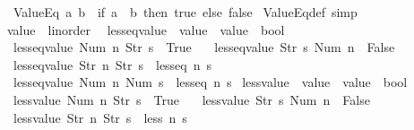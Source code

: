 \begin{isabellebody}
\ \ {\isachardoublequoteopen}ValueEq\ a\ b\ {\isasymequiv}\ {\isacharparenleft}if\ a\ {\isacharequal}\ b\ then\ true\ else\ false{\isacharparenright}{\isachardoublequoteclose}\isanewline
{}\isamarkupfalse%
\ ValueEq{\isacharunderscore}def\ {\isacharbrackleft}simp{\isacharbrackright}\isanewline
\isanewline
{}\isamarkupfalse%
\ {\isachardoublequoteopen}value{\isachardoublequoteclose}\ {\isacharcolon}{\isacharcolon}\ linorder\ \isanewline
{}\isamarkupfalse%
\ less{\isacharunderscore}eq{\isacharunderscore}value\ {\isacharcolon}{\isacharcolon}\ {\isachardoublequoteopen}value\ {\isasymRightarrow}\ value\ {\isasymRightarrow}\ bool{\isachardoublequoteclose}\ \isanewline
\ \ {\isachardoublequoteopen}less{\isacharunderscore}eq{\isacharunderscore}value\ {\isacharparenleft}Num\ n{\isacharparenright}\ {\isacharparenleft}Str\ s{\isacharparenright}\ {\isacharequal}\ True{\isachardoublequoteclose}\ {\isacharbar}\isanewline
\ \ {\isachardoublequoteopen}less{\isacharunderscore}eq{\isacharunderscore}value\ {\isacharparenleft}Str\ s{\isacharparenright}\ {\isacharparenleft}Num\ n{\isacharparenright}\ {\isacharequal}\ False{\isachardoublequoteclose}\ {\isacharbar}\isanewline
\ \ {\isachardoublequoteopen}less{\isacharunderscore}eq{\isacharunderscore}value\ {\isacharparenleft}Str\ n{\isacharparenright}\ {\isacharparenleft}Str\ s{\isacharparenright}\ {\isacharequal}\ less{\isacharunderscore}eq\ n\ s{\isachardoublequoteclose}\ {\isacharbar}\isanewline
\ \ {\isachardoublequoteopen}less{\isacharunderscore}eq{\isacharunderscore}value\ {\isacharparenleft}Num\ n{\isacharparenright}\ {\isacharparenleft}Num\ s{\isacharparenright}\ {\isacharequal}\ less{\isacharunderscore}eq\ n\ s{\isachardoublequoteclose}\isanewline
\isanewline
{}\isamarkupfalse%
\ less{\isacharunderscore}value\ {\isacharcolon}{\isacharcolon}\ {\isachardoublequoteopen}value\ {\isasymRightarrow}\ value\ {\isasymRightarrow}\ bool{\isachardoublequoteclose}\ \isanewline
\ \ {\isachardoublequoteopen}less{\isacharunderscore}value\ {\isacharparenleft}Num\ n{\isacharparenright}\ {\isacharparenleft}Str\ s{\isacharparenright}\ {\isacharequal}\ True{\isachardoublequoteclose}\ {\isacharbar}\isanewline
\ \ {\isachardoublequoteopen}less{\isacharunderscore}value\ {\isacharparenleft}Str\ s{\isacharparenright}\ {\isacharparenleft}Num\ n{\isacharparenright}\ {\isacharequal}\ False{\isachardoublequoteclose}\ {\isacharbar}\isanewline
\ \ {\isachardoublequoteopen}less{\isacharunderscore}value\ {\isacharparenleft}Str\ n{\isacharparenright}\ {\isacharparenleft}Str\ s{\isacharparenright}\ {\isacharequal}\ less\ n\ s{\isachardoublequoteclose}\ {\isacharbar}\isanewline

\end{isabellebody}
